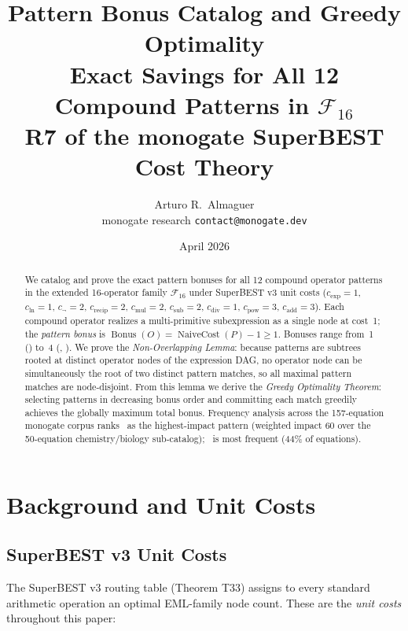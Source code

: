 \documentclass[12pt,a4paper]{article}
\title{Pattern Bonus Catalog and Greedy Optimality\\[6pt]
       \large Exact Savings for All 12 Compound Patterns in $\mathcal{F}_{16}$\\
       \normalsize R7 of the monogate SuperBEST Cost Theory}
\author{Arturo R.\ Almaguer\\
\small monogate research \quad \texttt{contact@monogate.dev}}
\date{April 2026}
\theoremstyle{definition}
\newcommand{\EXL}{\operatorname{EXL}}
\newcommand{\EAL}{\operatorname{EAL}}
\newcommand{\DEML}{\operatorname{DEML}}
\newcommand{\ELSb}{\operatorname{ELSb}}
\newcommand{\LEAd}{\operatorname{LEAd}}
\newcommand{\NC}{\operatorname{NaiveCost}}
\newcommand{\Bonus}{\operatorname{Bonus}}
\begin{document}
\maketitle

\begin{abstract}
We catalog and prove the exact pattern bonuses for all 12 compound operator
patterns in the extended 16-operator family $\mathcal{F}_{16}$ under
SuperBEST v3 unit costs
($c_{\exp}=1$, $c_{\ln}=1$, $c_{\neg}=2$, $c_{\mathrm{recip}}=2$,
$c_{\mathrm{mul}}=2$, $c_{\mathrm{sub}}=2$, $c_{\mathrm{div}}=1$,
$c_{\mathrm{pow}}=3$, $c_{\mathrm{add}}=3$).
Each compound operator realizes a multi-primitive subexpression as a single
node at cost~1; the \emph{pattern bonus} is $\Bonus(O)=\NC(P)-1\geq 1$.
Bonuses range from~1 (\ELSb) to~4 (\LEAd, \EAL).
We prove the \emph{Non-Overlapping Lemma}: because patterns are subtrees
rooted at distinct operator nodes of the expression DAG, no operator node
can be simultaneously the root of two distinct pattern matches, so all
maximal pattern matches are node-disjoint.
From this lemma we derive the \emph{Greedy Optimality Theorem}: selecting
patterns in decreasing bonus order and committing each match greedily
achieves the globally maximum total bonus.
Frequency analysis across the 157-equation monogate corpus ranks \EXL\ as
the highest-impact pattern (weighted impact 60 over the 50-equation
chemistry/biology sub-catalog); \DEML\ is most frequent (44\% of equations).
\end{abstract}

\tableofcontents
\bigskip

\section{Background and Unit Costs}
\label{sec:background}

\subsection{SuperBEST v3 Unit Costs}

The SuperBEST v3 routing table (Theorem T33) assigns to every standard
arithmetic operation an optimal EML-family node count.
These are the \emph{unit costs} throughout this paper:
\end{document}

